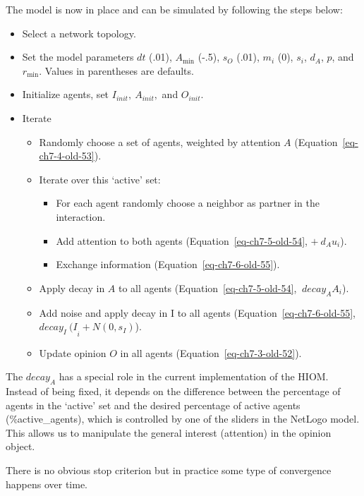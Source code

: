 \documentclass[
  a4paper,
  DIV=11,
  numbers=noendperiod,
  oneside]{scrreprt}
\begin{document}
The model is now in place and can be simulated by following the steps
below:

\begin{itemize}
\item
  Select a network topology.
\item
  Set the model parameters \(dt\) (.01), \(A_{\min}\) (-.5), \(s_{O}\)
  (.01), \(m_{i}\) (0), \(s_{i}\), \(d_{A}\), \(p\), and \(r_{\min}\).
  Values in parentheses are defaults.
\item
  Initialize agents, set \(I_{init},\ A_{init},\) and \(O_{init}\).
\item
  Iterate

  \begin{itemize}
  \item
    Randomly choose a set of agents, weighted by attention \(A\)
    (Equation~\ref{eq-ch7-4-old-53}).
  \item
    Iterate over this `active' set:

    \begin{itemize}
    \item
      For each agent randomly choose a neighbor as partner in the
      interaction.
    \item
      Add attention to both agents (Equation~\ref{eq-ch7-5-old-54},
      \(+ \ d_{A}u_{i}\)).
    \item
      Exchange information (Equation~\ref{eq-ch7-6-old-55}).
    \end{itemize}
  \item
    Apply decay in \(A\) to all agents (Equation~\ref{eq-ch7-5-old-54},
    \({\ decay}_{A}A_{i}\)).
  \item
    Add noise and apply decay in I to all agents
    (Equation~\ref{eq-ch7-6-old-55},
    \({decay_{I}\ (I}_{i} + Ν(0,s_{I})\)).
  \item
    Update opinion \(O\) in all agents (Equation~\ref{eq-ch7-3-old-52}).
  \end{itemize}
\end{itemize}

The \({decay}_{A}\) has a special role in the current implementation of
the HIOM. Instead of being fixed, it depends on the difference between
the percentage of agents in the `active' set and the desired percentage
of active agents (\%active\_agents), which is controlled by one of the
sliders in the NetLogo model. This allows us to manipulate the general
interest (attention) in the opinion object.

There is no obvious stop criterion but in practice some type of
convergence happens over time.
\end{document}
